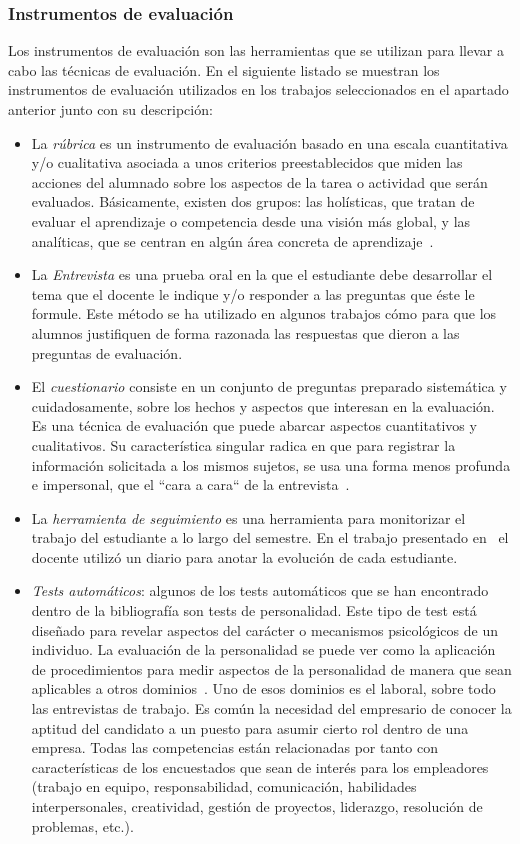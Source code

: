 \subsubsection*{Instrumentos de evaluación}

Los instrumentos de evaluación son las herramientas que se utilizan para llevar a cabo las técnicas de evaluación. En el siguiente listado se muestran los instrumentos de evaluación utilizados en los trabajos seleccionados en el apartado anterior junto con su descripción:

\begin{itemize}
\item La \emph{rúbrica} es un instrumento de evaluación basado en una escala cuantitativa y/o cualitativa asociada a unos criterios preestablecidos que miden las acciones del alumnado sobre los aspectos de la tarea o actividad que serán evaluados.  Básicamente, existen dos grupos: las holísticas, que tratan de evaluar el aprendizaje o competencia desde una visión más global, y las analíticas, que se centran en algún área concreta de aprendizaje~\cite{torres2010rubrica}.
\item La \emph{Entrevista} es una prueba oral en la que el estudiante debe desarrollar el tema que el docente le indique y/o responder a las preguntas que éste le formule. Este método se ha utilizado en algunos trabajos cómo \cite{ward2011developing} para que los alumnos justifiquen de forma razonada las respuestas que dieron a las preguntas de evaluación.
\item El \emph{cuestionario} consiste en un conjunto de preguntas preparado sistemática y cuidadosamente, sobre los hechos y aspectos que interesan en la evaluación.  Es una técnica de evaluación que puede abarcar aspectos cuantitativos y cualitativos. Su característica singular radica en que para registrar la información solicitada a los mismos sujetos, se usa una forma menos profunda e impersonal, que el ``cara a cara`` de la entrevista~\cite{munoz2003cuestionario}. 
\item La \emph{herramienta de seguimiento} es una herramienta para monitorizar el trabajo del estudiante a lo largo del semestre. En el trabajo presentado en~\cite{lacuesta2009active} el docente utilizó un diario para anotar la evolución de cada estudiante.
\item \emph{Tests automáticos}: algunos de los tests automáticos que se han encontrado dentro de la bibliografía son tests de personalidad. Este tipo de test está diseñado para revelar aspectos del carácter o mecanismos psicológicos de un individuo. La evaluación de la personalidad se puede ver como la aplicación de procedimientos para medir aspectos de la personalidad de manera que sean aplicables a otros dominios~\cite{wiggins2003paradigms}. Uno de esos dominios es el laboral, sobre todo las entrevistas de trabajo. Es común la necesidad del empresario de conocer la aptitud del candidato a un puesto para asumir cierto rol dentro de una empresa. Todas las competencias están relacionadas por tanto con características de los encuestados que sean de interés para los empleadores (trabajo en equipo, responsabilidad, comunicación, habilidades interpersonales, creatividad, gestión de proyectos, liderazgo, resolución de problemas, etc.).

\end{itemize}
